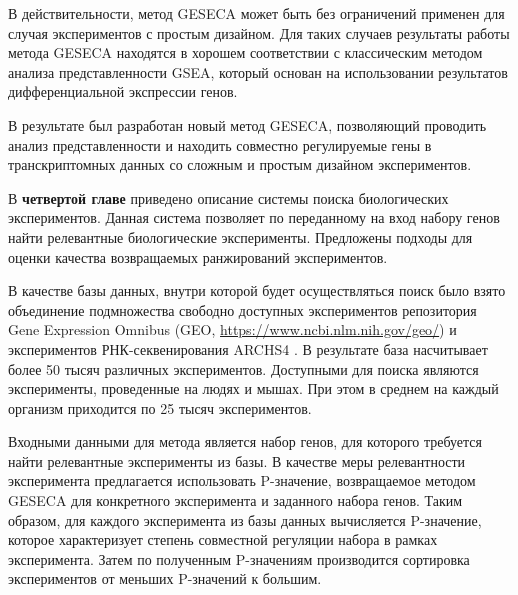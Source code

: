В действительности, метод GESECA может быть без ограничений применен для случая экспериментов с простым дизайном.
Для таких случаев результаты работы метода GESECA находятся в хорошем соответствии с классическим методом анализа представленности GSEA, который основан на использовании результатов дифференциальной экспрессии генов.

В результате был разработан новый метод GESECA, позволяющий проводить анализ представленности и находить совместно регулируемые гены в транскриптомных данных со сложным и простым дизайном экспериментов.




В \textbf{четвертой главе} приведено описание системы поиска биологических экспериментов.
Данная система позволяет по переданному на вход набору генов найти релевантные биологические эксперименты.
Предложены подходы для оценки качества возвращаемых ранжирований экспериментов.

В качестве базы данных, внутри которой будет осуществляться поиск было взято объединение подмножества свободно доступных экспериментов репозитория Gene Expression Omnibus (GEO, \url{https://www.ncbi.nlm.nih.gov/geo/}) и экспериментов РНК-секвенирования ARCHS4 \cite{lachmann2018massive}.
В результате база насчитывает более 50 тысяч различных экспериментов.
Доступными для поиска являются эксперименты, проведенные на людях и мышах.
При этом в среднем на каждый организм приходится по 25 тысяч экспериментов.

Входными данными для метода является набор генов, для которого требуется найти релевантные эксперименты из базы.
В качестве меры релевантности эксперимента предлагается использовать P-значение, возвращаемое методом GESECA для конкретного эксперимента и заданного набора генов.
Таким образом, для каждого эксперимента из базы данных вычисляется P-значение, которое характеризует степень совместной регуляции набора в рамках эксперимента.
Затем по полученным P-значениям производится сортировка экспериментов от меньших P-значений к большим.

